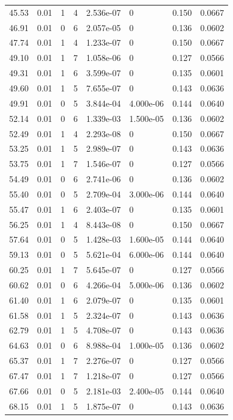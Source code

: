 \documentclass[preview]{standalone}
\begin{document}
{{{\begin{tabular}{L{1.2cm}C{1.2cm} C{0.3cm}C{0.5cm} C{1.4cm}C{1.4cm} C{1.4cm}C{1.4cm}}
  45.53  &  0.01  & 1     &  4 &  2.536e-07  & 0  & 0.150 &  0.0667   \\ 
  46.91  &  0.01  & 0     &  6 &  2.057e-05  & 0  & 0.136 &  0.0602   \\ 
  47.74  &  0.01  & 1     &  4 &  1.233e-07  & 0  & 0.150 &  0.0667   \\ 
  49.10  &  0.01  & 1     &  7 &  1.058e-06  & 0  & 0.127 &  0.0566   \\ 
  49.31  &  0.01  & 1     &  6 &  3.599e-07  & 0  & 0.135 &  0.0601   \\ 
  49.60  &  0.01  & 1     &  5 &  7.655e-07  & 0  & 0.143 &  0.0636   \\ 
  49.91  &  0.01  & 0     &  5 &  3.844e-04  & 4.000e-06  & 0.144 &  0.0640   \\ 
  52.14  &  0.01  & 0     &  6 &  1.339e-03  & 1.500e-05  & 0.136 &  0.0602   \\ 
  52.49  &  0.01  & 1     &  4 &  2.293e-08  & 0  & 0.150 &  0.0667   \\ 
  53.25  &  0.01  & 1     &  5 &  2.989e-07  & 0  & 0.143 &  0.0636   \\ 
  53.75  &  0.01  & 1     &  7 &  1.546e-07  & 0  & 0.127 &  0.0566   \\ 
  54.49  &  0.01  & 0     &  6 &  2.741e-06  & 0  & 0.136 &  0.0602   \\ 
  55.40  &  0.01  & 0     &  5 &  2.709e-04  & 3.000e-06  & 0.144 &  0.0640   \\ 
  55.47  &  0.01  & 1     &  6 &  2.403e-07  & 0  & 0.135 &  0.0601   \\ 
  56.25  &  0.01  & 1     &  4 &  8.443e-08  & 0  & 0.150 &  0.0667   \\ 
  57.64  &  0.01  & 0     &  5 &  1.428e-03  & 1.600e-05  & 0.144 &  0.0640   \\ 
  59.13  &  0.01  & 0     &  5 &  5.621e-04  & 6.000e-06  & 0.144 &  0.0640   \\ 
  60.25  &  0.01  & 1     &  7 &  5.645e-07  & 0  & 0.127 &  0.0566   \\ 
  60.62  &  0.01  & 0     &  6 &  4.266e-04  & 5.000e-06  & 0.136 &  0.0602   \\ 
  61.40  &  0.01  & 1     &  6 &  2.079e-07  & 0  & 0.135 &  0.0601   \\ 
  61.58  &  0.01  & 1     &  5 &  2.324e-07  & 0  & 0.143 &  0.0636   \\ 
  62.79  &  0.01  & 1     &  5 &  4.708e-07  & 0  & 0.143 &  0.0636   \\ 
  64.63  &  0.01  & 0     &  6 &  8.988e-04  & 1.000e-05  & 0.136 &  0.0602   \\ 
  65.37  &  0.01  & 1     &  7 &  2.276e-07  & 0  & 0.127 &  0.0566   \\ 
  67.47  &  0.01  & 1     &  7 &  1.218e-07  & 0  & 0.127 &  0.0566   \\ 
  67.66  &  0.01  & 0     &  5 &  2.181e-03  & 2.400e-05  & 0.144 &  0.0640   \\ 
  68.15  &  0.01  & 1     &  5 &  1.875e-07  & 0  & 0.143 &  0.0636   \\ 
\hline 
\end{tabular} 

}}}
\end{document}
